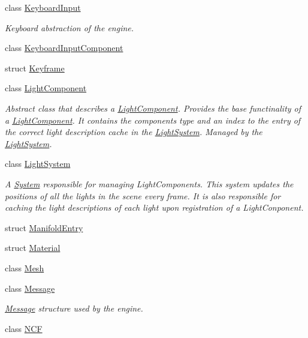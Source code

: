 \begin{DoxyCompactItemize}
\item 
class \hyperlink{class_blade_1_1_keyboard_input}{Keyboard\+Input}
\begin{DoxyCompactList}\small\item\em Keyboard abstraction of the engine. \end{DoxyCompactList}\item 
class \hyperlink{class_blade_1_1_keyboard_input_component}{Keyboard\+Input\+Component}
\item 
struct \hyperlink{struct_blade_1_1_keyframe}{Keyframe}
\item 
class \hyperlink{class_blade_1_1_light_component}{Light\+Component}
\begin{DoxyCompactList}\small\item\em Abstract class that describes a \hyperlink{class_blade_1_1_light_component}{Light\+Component}. Provides the base functinality of a \hyperlink{class_blade_1_1_light_component}{Light\+Component}. It contains the component\textquotesingle{}s type and an index to the entry of the correct light description cache in the \hyperlink{class_blade_1_1_light_system}{Light\+System}. Managed by the \hyperlink{class_blade_1_1_light_system}{Light\+System}. \end{DoxyCompactList}\item 
class \hyperlink{class_blade_1_1_light_system}{Light\+System}
\begin{DoxyCompactList}\small\item\em A \hyperlink{class_blade_1_1_system}{System} responsible for managing Light\+Components. This system updates the positions of all the lights in the scene every frame. It is also responsible for caching the light descriptions of each light upon registration of a Light\+Conponent. \end{DoxyCompactList}\item 
struct \hyperlink{struct_blade_1_1_manifold_entry}{Manifold\+Entry}
\item 
struct \hyperlink{struct_blade_1_1_material}{Material}
\item 
class \hyperlink{class_blade_1_1_mesh}{Mesh}
\item 
class \hyperlink{class_blade_1_1_message}{Message}
\begin{DoxyCompactList}\small\item\em \hyperlink{class_blade_1_1_message}{Message} structure used by the engine. \end{DoxyCompactList}\item 
class \hyperlink{class_blade_1_1_n_c_f}{N\+CF}

\end{DoxyCompactItemize}
